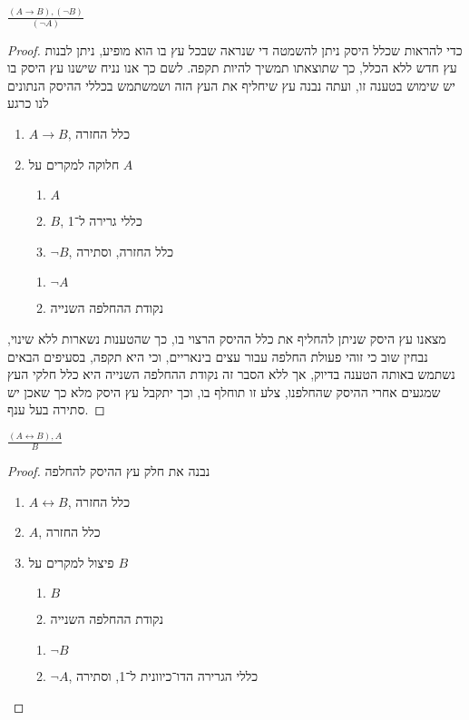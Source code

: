 \subquestion{}
$\frac{(A \to B), (\lnot B)}{(\lnot A)}$
\begin{proof}
	כדי להראות שכלל היסק ניתן להשמטה די שנראה שבכל עץ בו הוא מופיע, ניתן לבנות עץ חדש ללא הכלל, כך שתוצאתו תמשיך להיות תקפה.
	לשם כך אנו נניח שישנו עץ היסק בו יש שימוש בטענה זו, ועתה נבנה עץ שיחליף את העץ הזה ושמשתמש בכללי ההיסק הנתונים לנו כרגע
	\begin{enumerate}
		\item $A \to B$, כלל החזרה
		\item חלוקה למקרים על $A$
			\begin{enumerate}
				\item $A$
				\item $B$, כללי גרירה ל־1
				\item $\lnot B$, כלל החזרה, וסתירה
			\end{enumerate}
			\begin{enumerate}
				\item $\lnot A$
				\item נקודת ההחלפה השנייה
			\end{enumerate}
	\end{enumerate}
	מצאנו עץ היסק שניתן להחליף את כלל ההיסק הרצוי בו, כך שהטענות נשארות ללא שינוי, נבחין שוב כי זוהי פעולת החלפה עבור עצים בינאריים, וכי היא תקפה, בסעיפים הבאים נשתמש באותה הטענה בדיוק, אך ללא הסבר זה
	נקודת ההחלפה השנייה היא כלל חלקי העץ שמגעים אחרי ההיסק שהחלפנו, צלע זו תוחלף בו, וכך יתקבל עץ היסק מלא כך שאכן יש סתירה בעל ענף.
\end{proof}

\subquestion{}
$\frac{(A \leftrightarrow B), A}{B}$
\begin{proof}
	נבנה את חלק עץ ההיסק להחלפה
	\begin{enumerate}
		\item $A \leftrightarrow B$, כלל החזרה
		\item $A$, כלל החזרה
		\item פיצול למקרים על $B$
			\begin{enumerate}
				\item $B$
				\item נקודת ההחלפה השנייה
			\end{enumerate}
			\begin{enumerate}
				\item $\lnot B$
				\item $\lnot A$, כללי הגרירה הדו־כיוונית ל־1, וסתירה
			\end{enumerate}
	\end{enumerate}
\end{proof}

